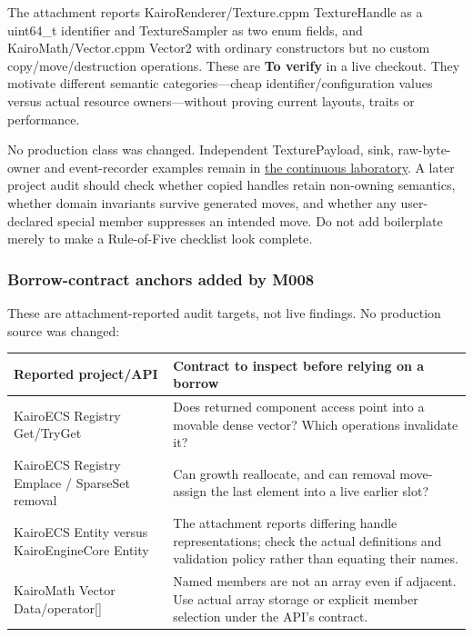 The attachment reports KairoRenderer/Texture.cppm TextureHandle as a uint64\_t identifier and TextureSampler as two enum fields, and KairoMath/Vector.cppm Vector2 with ordinary constructors but no custom copy/move/destruction operations. These are \textbf{To verify} in a live checkout. They motivate different semantic categories---cheap identifier/configuration values versus actual resource owners---without proving current layouts, traits or performance.

No production class was changed. Independent TexturePayload, sink, raw-byte-owner and event-recorder examples remain in \hyperref[01-foundations-i-ch004-complete-runnable-value-transfer-laboratory]{the continuous laboratory}. A later project audit should check whether copied handles retain non-owning semantics, whether domain invariants survive generated moves, and whether any user-declared special member suppresses an intended move. Do not add boilerplate merely to make a Rule-of-Five checklist look complete.

\subsubsection{Borrow-contract anchors added by M008}\label{appendix-4e2236f53445-borrow-contract-anchors-added-by-m008}

These are attachment-reported audit targets, not live findings. No production source was changed:

{\def\LTcaptype{none} %
\begin{longtable}[]{@{}
  >{\raggedright\arraybackslash}p{}
  >{\raggedright\arraybackslash}p{}@{}}
\toprule\noalign{}
\begin{minipage}[b]{\linewidth}\raggedright
Reported project/API
\end{minipage} & \begin{minipage}[b]{\linewidth}\raggedright
Contract to inspect before relying on a borrow
\end{minipage} \\
\midrule\noalign{}
\endhead
\bottomrule\noalign{}
\endlastfoot
KairoECS Registry Get/TryGet & Does returned component access point into a movable dense vector? Which operations invalidate it? \\
KairoECS Registry Emplace / SparseSet removal & Can growth reallocate, and can removal move-assign the last element into a live earlier slot? \\
KairoECS Entity versus KairoEngineCore Entity & The attachment reports differing handle representations; check the actual definitions and validation policy rather than equating their names. \\
KairoMath Vector Data/operator{[}{]} & Named members are not an array even if adjacent. Use actual array storage or explicit member selection under the API's contract. \\
\end{longtable}
}

